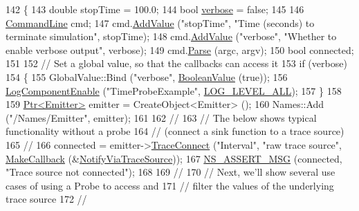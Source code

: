 \begin{DoxyCode}
142 \{
143   \textcolor{keywordtype}{double} stopTime = 100.0;
144   \textcolor{keywordtype}{bool} \hyperlink{openflow-switch_8cc_ab3f078684998b83967d507d0f453f454}{verbose} = \textcolor{keyword}{false};
145 
146   \hyperlink{classns3_1_1CommandLine}{CommandLine} cmd;
147   cmd.\hyperlink{classns3_1_1CommandLine_addcfb546c7ad4c8bd0965654d55beb8e}{AddValue} (\textcolor{stringliteral}{"stopTime"}, \textcolor{stringliteral}{"Time (seconds) to terminate simulation"}, stopTime);
148   cmd.\hyperlink{classns3_1_1CommandLine_addcfb546c7ad4c8bd0965654d55beb8e}{AddValue} (\textcolor{stringliteral}{"verbose"}, \textcolor{stringliteral}{"Whether to enable verbose output"}, verbose);
149   cmd.\hyperlink{classns3_1_1CommandLine_a5c10b85b3207e5ecb48d907966923156}{Parse} (argc, argv);
150   \textcolor{keywordtype}{bool} connected;
151 
152   \textcolor{comment}{// Set a global value, so that the callbacks can access it}
153   \textcolor{keywordflow}{if} (verbose)
154     \{
155       GlobalValue::Bind (\textcolor{stringliteral}{"verbose"}, \hyperlink{classns3_1_1BooleanValue}{BooleanValue} (\textcolor{keyword}{true}));
156       \hyperlink{namespacens3_adc4ef4f00bb2f5f4edae67fc3bc27f20}{LogComponentEnable} (\textcolor{stringliteral}{"TimeProbeExample"}, \hyperlink{namespacens3_aa6464a4d69551a9cc968e17a65f39bdba022b1237a4fd1b08d034471df3c58586}{LOG\_LEVEL\_ALL});
157     \}
158 
159   \hyperlink{classns3_1_1Ptr}{Ptr<Emitter>} emitter = CreateObject<Emitter> ();
160   Names::Add (\textcolor{stringliteral}{"/Names/Emitter"}, emitter);
161 
162   \textcolor{comment}{//}
163   \textcolor{comment}{// The below shows typical functionality without a probe}
164   \textcolor{comment}{// (connect a sink function to a trace source)}
165   \textcolor{comment}{//}
166   connected = emitter->\hyperlink{classns3_1_1ObjectBase_ada3a45b34bc23114a25e0ab19188276e}{TraceConnect} (\textcolor{stringliteral}{"Interval"}, \textcolor{stringliteral}{"raw trace source"}, 
      \hyperlink{group__makecallbackmemptr_ga9376283685aa99d204048d6a4b7610a4}{MakeCallback} (&\hyperlink{time-probe-example_8cc_ad814e60140a70993531da0fd84afe604}{NotifyViaTraceSource}));
167   \hyperlink{assert_8h_aff5ece9066c74e681e74999856f08539}{NS\_ASSERT\_MSG} (connected, \textcolor{stringliteral}{"Trace source not connected"});
168 
169   \textcolor{comment}{//}
170   \textcolor{comment}{// Next, we'll show several use cases of using a Probe to access and}
171   \textcolor{comment}{// filter the values of the underlying trace source}
172   \textcolor{comment}{//}

\end{DoxyCode}

